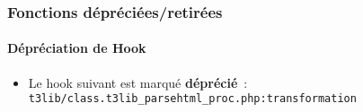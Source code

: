 %

\begin{frame}[fragile]
	\frametitle{Fonctions dépréciées/retirées}
	\framesubtitle{Dépréciation de Hook}

	\begin{itemize}
		\item Le hook suivant est marqué \textbf{déprécié}~:\newline
			\small
				\texttt{t3lib/class.t3lib\_parsehtml\_proc.php:transformation}
			\normalsize
	\end{itemize}

\end{frame}

